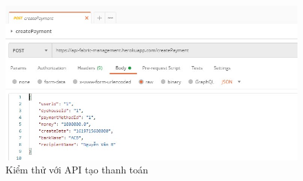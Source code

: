 \begin{figure}[H]
    \begin{center}
        \includegraphics[width=12cm]{Image/API/13_createPayment.jpg}
        \caption{Kiểm thử với API tạo thanh toán}
        \label{updateDyehouse}
    \end{center}
\end{figure}


